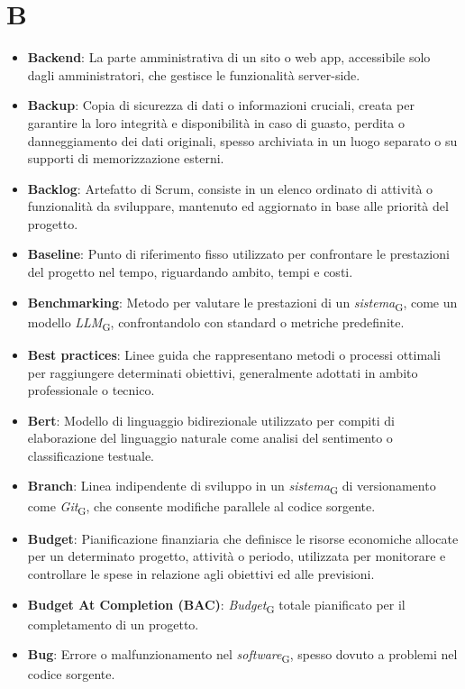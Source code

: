 \section{B}
\begin{itemize}
    \item \textbf{Backend}: La parte amministrativa di un sito o web app, accessibile solo dagli amministratori, che gestisce le funzionalità server-side.
    \item \textbf{Backup}: Copia di sicurezza di dati o informazioni cruciali, creata per garantire la loro integrità e disponibilità in caso di guasto, perdita o danneggiamento dei dati originali, spesso archiviata in un luogo separato o su supporti di memorizzazione esterni.
    \item \textbf{Backlog}: Artefatto di Scrum, consiste in un elenco ordinato di attività o funzionalità da sviluppare, mantenuto ed aggiornato in base alle priorità del progetto.
    \item \textbf{Baseline}: Punto di riferimento fisso utilizzato per confrontare le prestazioni del progetto nel tempo, riguardando ambito, tempi e costi.
    \item \textbf{Benchmarking}: Metodo per valutare le prestazioni di un \textit{sistema}\textsubscript{G}, come un modello \textit{LLM}\textsubscript{G}, confrontandolo con standard o metriche predefinite.
    \item \textbf{Best practices}: Linee guida che rappresentano metodi o processi ottimali per raggiungere determinati obiettivi, generalmente adottati in ambito professionale o tecnico.
    \item \textbf{Bert}: Modello di linguaggio bidirezionale utilizzato per compiti di elaborazione del linguaggio naturale come analisi del sentimento o classificazione testuale.
    \item \textbf{Branch}: Linea indipendente di sviluppo in un \textit{sistema}\textsubscript{G} di versionamento come \textit{Git}\textsubscript{G}, che consente modifiche parallele al codice sorgente.
    \item \textbf{Budget}: Pianificazione finanziaria che definisce le risorse economiche allocate per un determinato progetto, attività o periodo, utilizzata per monitorare e controllare le spese in relazione agli obiettivi ed alle previsioni.
    \item \textbf{Budget At Completion (BAC)}: \textit{Budget}\textsubscript{G} totale pianificato per il completamento di un progetto.
    \item \textbf{Bug}: Errore o malfunzionamento nel \textit{software}\textsubscript{G}, spesso dovuto a problemi nel codice sorgente.
\end{itemize}

